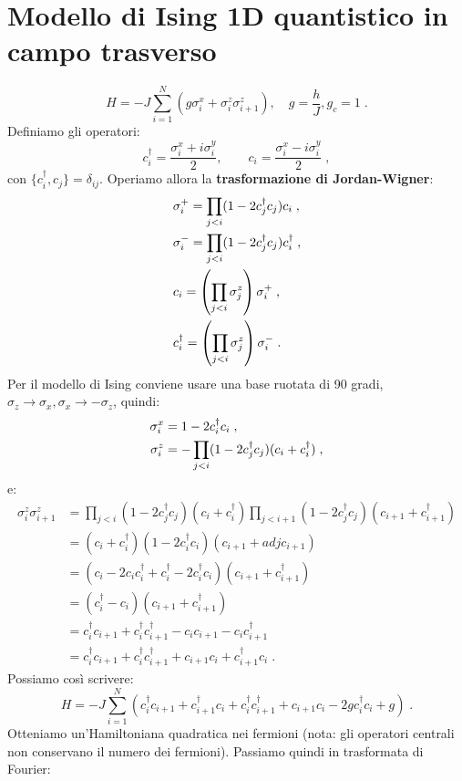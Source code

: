 \documentclass[10pt,a4paper]{report}
\theoremstyle{definition}
\numberwithin{equation}{section}
\newcommand{\adj}[1]{#1^{\dagger}}
\begin{document}
\section{Modello di Ising 1D quantistico in campo trasverso}
\begin{equation}
H=-J\sum_{i=1}^N(g\sigma_i^x+\sigma_i^z\sigma_{i+1}^z),\quad  g=\frac{h}{J}, g_c=1\;.
\end{equation}
Definiamo gli operatori:
\begin{equation}
\adj{c}_i=\frac{\sigma_i^x+i\sigma_i^y}{2},\qquad c_i=\frac{\sigma_i^x-i\sigma_i^y}{2}\;,
\end{equation}
con $\{\adj{c}_i,c_j\}=\delta_{ij}$. Operiamo allora la \textbf{trasformazione di Jordan-Wigner}:
\begin{align}
&\sigma_i^+=\prod_{j<i}(1-2\adj{c}_jc_j)c_i \notag\;, \\
&\sigma_i^-=\prod_{j<i}(1-2\adj{c}_jc_j)\adj{c}_i \notag\;, \\
& c_i=\left(\prod_{j<i}\sigma_j^z\right)\sigma^+_i \notag\;, \\
&\adj{c}_i=\left(\prod_{j<i}\sigma_j^z\right)\sigma_i^-\;.
\end{align}
Per il modello di Ising conviene usare una base ruotata di 90 gradi, $\sigma_z\to\sigma_x,\sigma_x\to-\sigma_z$, quindi:
\begin{align}
\sigma_i^x&= 1-2\adj{c}_ic_i \notag\;, \\
\sigma_i^z&=-\prod_{j<i}(1-2\adj{c}_jc_j)(c_i+\adj{c}_i)\;,
\end{align}
e:
\begin{align*}
\sigma_i^z\sigma_{i+1}^z &= \prod_{j<i}(1-2\adj{c}_jc_j)(c_i+\adj{c}_i)\prod_{j<i+1}(1-2\adj{c}_jc_j)(c_{i+1}+\adj{c}_{i+1}) \\
&=  (c_i+\adj{c}_i)(1-2\adj{c}_ic_i)(c_{i+1}+adj{c}_{i+1}) \\
&=  (c_i-2c_i\adj{c}_i+\adj{c}_i-2\adj{c}_ic_i)(c_{i+1}+\adj{c}_{i+1}) \\
&= (\adj{c}_i-c_i)(c_{i+1}+\adj{c}_{i+1}) \\
&= \adj{c}_ic_{i+1}+\adj{c}_i\adj{c}_{i+1}-c_ic_{i+1}-c_i\adj{c}_{i+1} \\
&= \adj{c}_ic_{i+1}+\adj{c}_i\adj{c}_{i+1}+c_{i+1}c_i+\adj{c}_{i+1}c_i\;.
\end{align*}
Possiamo così scrivere:
\begin{equation}
H=-J\sum_{i=1}^N(\adj{c}_ic_{i+1}+\adj{c}_{i+1}c_i+\adj{c}_i\adj{c}_{i+1}+c_{i+1}c_i-2g\adj{c}_ic_i+g)\;.
\end{equation}
Otteniamo un'Hamiltoniana quadratica nei fermioni (nota: gli operatori centrali non conservano il numero dei fermioni). Passiamo quindi in trasformata di Fourier:
\end{document}
